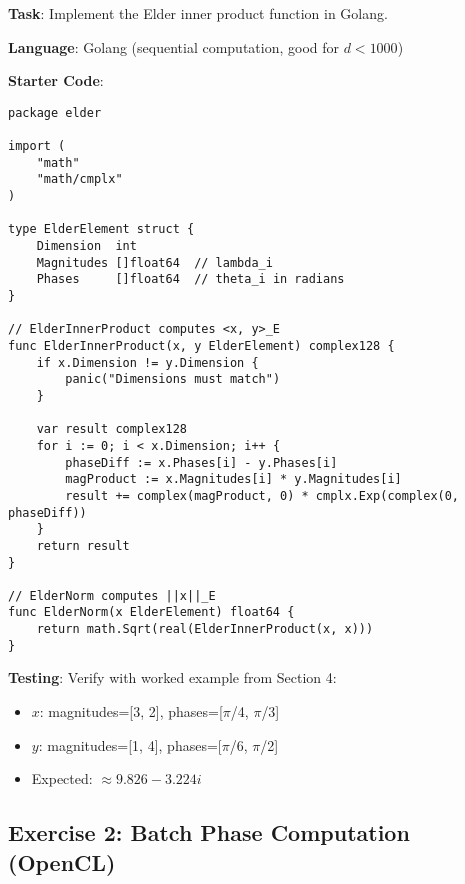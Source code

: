 \documentclass[12pt,a4paper]{article}
\theoremstyle{definition}
\theoremstyle{remark}
\begin{document}
\begin{tcolorbox}[colback=green!5,colframe=green!70!black,title=Coding Exercise: Golang Implementation]
\textbf{Task}: Implement the Elder inner product function in Golang.

\textbf{Language}: Golang (sequential computation, good for $d < 1000$)

\textbf{Starter Code}:
\begin{verbatim}
package elder

import (
    "math"
    "math/cmplx"
)

type ElderElement struct {
    Dimension  int
    Magnitudes []float64  // lambda_i
    Phases     []float64  // theta_i in radians
}

// ElderInnerProduct computes <x, y>_E
func ElderInnerProduct(x, y ElderElement) complex128 {
    if x.Dimension != y.Dimension {
        panic("Dimensions must match")
    }
    
    var result complex128
    for i := 0; i < x.Dimension; i++ {
        phaseDiff := x.Phases[i] - y.Phases[i]
        magProduct := x.Magnitudes[i] * y.Magnitudes[i]
        result += complex(magProduct, 0) * cmplx.Exp(complex(0, phaseDiff))
    }
    return result
}

// ElderNorm computes ||x||_E
func ElderNorm(x ElderElement) float64 {
    return math.Sqrt(real(ElderInnerProduct(x, x)))
}
\end{verbatim}

\textbf{Testing}: Verify with worked example from Section 4:
\begin{itemize}
\item $x$: magnitudes=[3, 2], phases=[$\pi$/4, $\pi$/3]
\item $y$: magnitudes=[1, 4], phases=[$\pi$/6, $\pi$/2]
\item Expected: $\approx 9.826 - 3.224i$
\end{itemize}
\end{tcolorbox}

\subsection{Exercise 2: Batch Phase Computation (OpenCL)}
\end{document}
